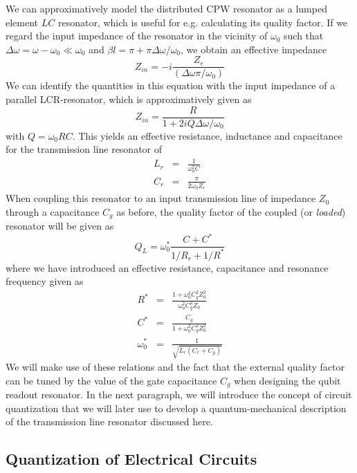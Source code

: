 We can approximatively model the distributed CPW resonator as a lumped element $LC$ resonator, which is useful for e.g. calculating its quality factor. If we regard the input impedance of the resonator in the vicinity of $\omega_0$ such that $\Delta \omega = \omega -\omega_0 \ll \omega_0$ and $\beta l = \pi +\pi\Delta \omega /\omega_0$, we obtain an effective impedance
%
\begin{equation}
Z_{in} = -i\frac{Z_{r}}{(\Delta \omega \pi / \omega_0)}
\end{equation}
%
We can identify the quantities in this equation with the input impedance of a parallel LCR-resonator, which is approximatively given as
%
\begin{equation}
Z_{in} = \frac{R}{1+2i Q \Delta \omega / \omega_0}
\end{equation}
%
with $Q=\omega_0 RC$. This yields an effective resistance, inductance and capacitance for the transmission line resonator of
%
\begin{eqnarray}
L_{r} & = & \frac{1}{\omega_0^2 C} \\
C_{r} & = & \frac{\pi}{2\omega_0 Z_r}
\end{eqnarray}
%
When coupling this resonator to an input transmission line of impedance $Z_0$ through a  capacitance $C_g$ as before, the quality factor of the coupled (or {\it loaded}) resonator will be given as
%
\begin{equation}
Q_L = \omega_0^* \frac{C+C^*}{1/R_{r}+1/R^*}
\end{equation}
%
where we have introduced an effective resistance, capacitance and resonance frequency given as
%
\begin{eqnarray}
R^* & = & \frac{1+\omega_0^2 C_g^2 Z_0^2}{\omega_0^2 C_g^2 Z_0} \\
C^* & = & \frac{C_g}{1+\omega_0^2 C_g^2 Z_0^2} \\
\omega_0^* & = & \frac{1}{\sqrt{L_r(C_r+C_g)}}
\end{eqnarray}
%
We will make use of these relations and the fact that the external quality factor can be tuned by the value of the gate capacitance $C_g$ when designing the qubit readout resonator. In the next paragraph, we will introduce the concept of circuit quantization that we will later use to develop a quantum-mechanical description of the transmission line resonator discussed here.

\subsection{Quantization of Electrical Circuits}

